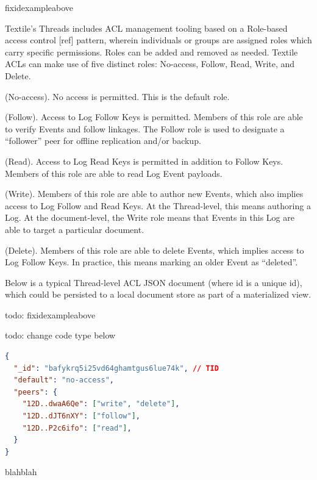 \documentclass{comjnl}
\begin{document}
fixidexampleabove

Textile’s Threads includes ACL management tooling based on a Role-based access control [ref] pattern, wherein individuals or groups are assigned roles which carry specific permissions. Roles can be added and removed as needed. Textile ACLs can make use of five distinct roles: No-access, Follow, Read, Write, and Delete.

\begin{definition}
(No-access). No access is permitted. This is the default role.
\end{definition}

\begin{definition}
(Follow). Access to Log Follow Keys is permitted. Members of this role are able to verify Events and follow linkages. The Follow role is used to designate a “follower” peer for offline replication and/or backup.
\end{definition}

\begin{definition}
(Read). Access to Log Read Keys is permitted in addition to Follow Keys. Members of this role are able to read Log Event payloads.
\end{definition}

\begin{definition}
(Write). Members of this role are able to author new Events, which also implies access to Log Follow and Read Keys. At the Thread-level, this means authoring a Log. At the document-level, the Write role means that Events in this Log are able to target a particular document.
\end{definition}

\begin{definition}
(Delete). Members of this role are able to delete Events, which implies access to Log Follow Keys. In practice, this means marking an older Event as “deleted”.
\end{definition}

Below is a typical Thread-level ACL JSON document (where id is a unique id), which could be persisted to a local document store as part of a materialized view.

todo: fixidexampleabove 

todo: change code type below

\begin{example}
\begin{minipage}{.45\textwidth}
\begin{lstlisting}[language=json,firstnumber=1]
{
  "_id": "bafykrq5i25vd64ghamtgus6lue74k", // TID
  "default": "no-access",
  "peers": {
    "12D..dwaA6Qe": ["write", "delete"],
    "12D..dJT6nXY": ["follow"],
    "12D..P2c6ifo": ["read"],
  }
}
\end{lstlisting}
\caption{blahblah}
\end{minipage}
\end{example}
\end{document}
